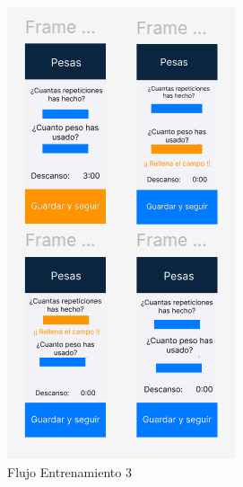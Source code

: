 \begin{figure}[H]
\begin{minipage}[b]{0.45\textwidth}
    \includegraphics[width=\textwidth]{fotos/FE3.png}
    \caption{Flujo Entrenamiento 3}
    \label{fig:Flujo Entrenamiento 3}
  \end{minipage}
\end{figure}

